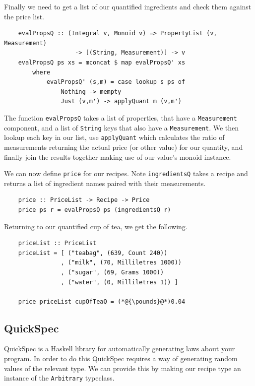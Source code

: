 \documentclass[11pt]{article}
\begin{document}
Finally we need to get a list of our quantified ingredients and check them
against the price list.

\begin{lstlisting}
    evalPropsQ :: (Integral v, Monoid v) => PropertyList (v, Measurement)
                    -> [(String, Measurement)] -> v
    evalPropsQ ps xs = mconcat $ map evalPropsQ' xs
        where
            evalPropsQ' (s,m) = case lookup s ps of
                Nothing -> mempty
                Just (v,m') -> applyQuant m (v,m')
\end{lstlisting}

The function \texttt{evalPropsQ} takes a list of properties, that have a \texttt{Measurement}
component, and a list of \texttt{String} keys that also have a \texttt{Measurement}.
We then lookup each key in our list, use \texttt{applyQuant} which calculates the ratio
of measurements returning the actual price (or other value) for our quantity, and finally
join the results together making use of our value's monoid instance.

\medbreak

We can now define \texttt{price} for our recipes. Note \texttt{ingredientsQ} takes a recipe
and returns a list of ingredient names paired with their measurements.

\begin{lstlisting}
    price :: PriceList -> Recipe -> Price
    price ps r = evalPropsQ ps (ingredientsQ r)
\end{lstlisting}

Returning to our quantified cup of tea, we get the following.

\begin{lstlisting}
    priceList :: PriceList
    priceList = [ ("teabag", (639, Count 240))
                , ("milk", (70, Milliletres 1000))
                , ("sugar", (69, Grams 1000))
                , ("water", (0, Milliletres 1)) ]

    price priceList cupOfTeaQ = (*@{\pounds}@*)0.04
\end{lstlisting}

\subsection{QuickSpec}

QuickSpec \cite{quickspec, quickspec2} is a Haskell library for automatically generating
laws about your program. In order to do this QuickSpec requires a way of generating
random values of the relevant type. We can provide this by making our recipe type
an instance of the \texttt{Arbitrary} typeclass.
\end{document}
